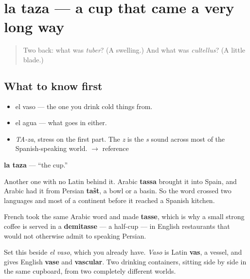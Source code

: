 \section[la taza]{la taza — a cup that came a very long way}

\label{lesson:ES-C294-taza}



\begin{quote}
Two back: what was \emph{tuber}? (A swelling.) And what was \emph{cultellus}? (A little blade.)
\end{quote}

\subsection*{What to know first}
\begin{itemize}
\raggedright
  \item el vaso — the one you drink cold things from.
  \item el agua — what goes in either.
\end{itemize}

\begin{sounds}
\begin{itemize}
\raggedright
  \item \emph{TA-za}, stress on the first part. The \emph{z} is the \emph{s} sound across most of the Spanish-speaking world. $\to$ reference
\end{itemize}
\end{sounds}

\begin{cousinweb}
\textbf{la taza} — \textquotedblleft{}the cup.\textquotedblright{}

Another one with no Latin behind it. Arabic \textbf{tassa} brought it into Spain, and Arabic had it from Persian \textbf{tašt}, a bowl or a basin. So the word crossed two languages and most of a continent before it reached a Spanish kitchen.

French took the same Arabic word and made \textbf{tasse}, which is why a small strong coffee is served in a \textbf{demitasse} — a half-cup — in English restaurants that would not otherwise admit to speaking Persian.

Set this beside \emph{el vaso}, which you already have. \emph{Vaso} is Latin \textbf{vas}, a vessel, and gives English \textbf{vase} and \textbf{vascular}. Two drinking containers, sitting side by side in the same cupboard, from two completely different worlds.
\end{cousinweb}

